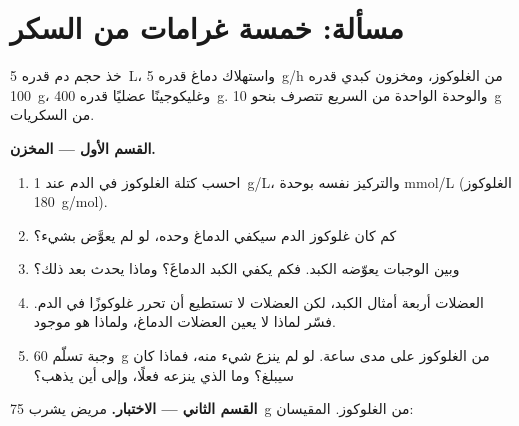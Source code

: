 \section{مسألة: خمسة غرامات من السكر}

\begin{problem}
\label{pb:g12:glucose-and-diabetes:1}
خذ حجم دم قدره \qty{5}{L}، واستهلاك دماغ قدره \qty{5}{g/h} من
الغلوكوز، ومخزون  كبدي قدره \qty{100}{g}، وغليكوجينًا عضليًا
قدره \qty{400}{g}. والوحدة الواحدة من  السريع تتصرف بنحو
\qty{10}{g} من السكريات.

\medskip
\noindent\textbf{القسم الأول --- المخزن.}
\begin{enumerate}
  \item احسب كتلة الغلوكوز في الدم عند \qty{1}{g/L}، والتركيز نفسه
        بوحدة \unit{mmol/L} (الغلوكوز \qty{180}{g/mol}).
  \item كم كان غلوكوز الدم سيكفي الدماغ وحده، لو لم يعوَّض بشيء؟
  \item وبين الوجبات يعوّضه الكبد. فكم يكفي  الكبد الدماغَ؟
        وماذا يحدث بعد ذلك؟
  \item {} العضلات أربعة أمثال  الكبد، لكن العضلات لا
        تستطيع أن تحرر غلوكوزًا في الدم. فسّر لماذا لا يعين 
        العضلات الدماغ، ولماذا هو موجود.
  \item وجبة تسلّم \qty{60}{g} من الغلوكوز على مدى ساعة. لو لم ينزع
        شيء منه، فماذا كان  سيبلغ؟ وما الذي ينزعه فعلًا، وإلى
        أين يذهب؟
\end{enumerate}

\medskip
\noindent\textbf{القسم الثاني --- الاختبار.}
مريض يشرب \qty{75}{g} من الغلوكوز.   المقيسان:


\end{problem}
